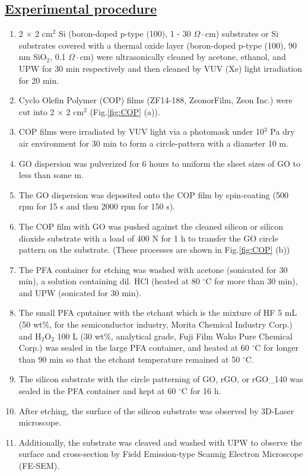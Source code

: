 \documentclass[platex,dvipdfmx]{jlreq}			%
\begin{document}
\subsection*{\ul{Experimental procedure}}
\begin{enumerate}
    \item 2 $\times$ 2 cm$^2$ Si (boron-doped p-type (100), 1 - 30 $\Omega\cdot$cm) substrates or Si substrates covered with a thermal oxide layer (boron-doped p-type (100), 90 nm SiO$_2$, 0.1 $\Omega\cdot$cm) were ultrasonically cleaned by acetone, ethanol, and UPW for 30 min respectively and then cleaned by VUV (Xe) light irradiation for 20 min.
    \item Cyclo Olefin Polymer (COP) films (ZF14-188, ZeonorFilm, Zeon Inc.) were cut into 2 $\times$ 2 cm$^2$ (Fig.\ref{fig:COP} (a)).
    \item COP films were irradiated by VUV light via a photomask under 10$^3$ Pa dry air environment for 30 min to form a circle-pattern with a diameter 10 \textmu m. 
    \item GO dispersion was pulverized for 6 hours to uniform the sheet sizes of GO to less than some \textmu m.
    \item The GO dispersion was deposited onto the COP film by spin-coating (500 rpm for 15 s and then 2000 rpm for 150 s).
    \item The COP film with GO was pushed against the cleaned silicon or silicon dioxide substrate with a load of 400 N for 1 h to transfer the GO circle pattern on the substrate. (These processes are shown in Fig.\ref{fig:COP} (b))
    \item The PFA container for etching was washed with acetone (sonicated for 30 min), a solution containing dil. HCl (heated at 80 ${}^\circ$C for more than 30 min), and UPW (sonicated for 30 min).
    \item The small PFA cpntainer with the etchant which is the mixture of HF 5 mL (50 wt\%, for the semiconductor industry, Morita Chemical Industry Corp.) and H$_2$O$_2$ 100 \textmu L (30 wt\%, analytical grade, Fuji Film Wako Pure Chemical Corp.) was sealed in the large PFA container, and heated at 60 ${}^\circ$C for longer than 90 min so that the etchant temperature remained at 50 ${}^\circ$C.
    \item The silicon substrate with the circle patterning of GO, rGO, or rGO\_140 was sealed in the PFA container and kept at 60 ${}^\circ$C for 16 h.
    \item After etching, the surface of the silicon substrate was observed by 3D-Laser microscope.
    \item Additionally, the substrate was cleaved and washed with UPW to observe the surface and cross-section by Field Emission-type Scannig Electron Microscope (FE-SEM).
\end{enumerate}
\end{document}
